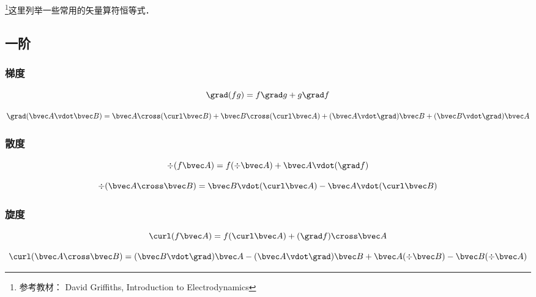 
\begin{issues}
\issueAbstract
\end{issues}



\footnote{参考教材： David Griffiths, Introduction to Electrodynamics}这里列举一些常用的矢量算符恒等式．

\subsection{一阶}
\subsubsection{梯度}
\begin{equation}
\grad (fg) = f\grad g + g \grad f
\end{equation}

\begin{equation}
\grad (\bvec A \vdot \bvec B) = \bvec A \cross (\curl \bvec B) + \bvec B \cross (\curl \bvec A) + (\bvec A \vdot \grad) \bvec B + (\bvec B \vdot \grad) \bvec A
\end{equation}

\subsubsection{散度}

\begin{equation}\label{VopEq_eq1}
\div (f \bvec A) = f (\div \bvec A) + \bvec A \vdot (\grad f)
\end{equation}

\begin{equation}
\div (\bvec A \cross \bvec B) = \bvec B \vdot (\curl \bvec A) - \bvec A \vdot (\curl \bvec B)
\end{equation}

\subsubsection{旋度}
\begin{equation}
\curl(f\bvec A) = f (\curl\bvec A) + (\grad f) \cross\bvec A
\end{equation}

\begin{equation}
\curl (\bvec A \cross \bvec B) = (\bvec B \vdot \grad) \bvec A - (\bvec A \vdot \grad) \bvec B + \bvec A (\div \bvec B) - \bvec B (\div \bvec A)
\end{equation}

